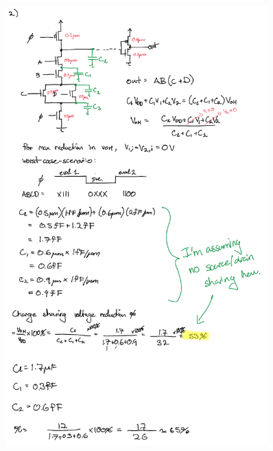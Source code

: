 \documentclass[11pt]{article}
\begin{document}
\begin{figure}[H]
    \centering
\includegraphics[width=0.9\textwidth]{2a.png}
\end{figure}
\end{document}
